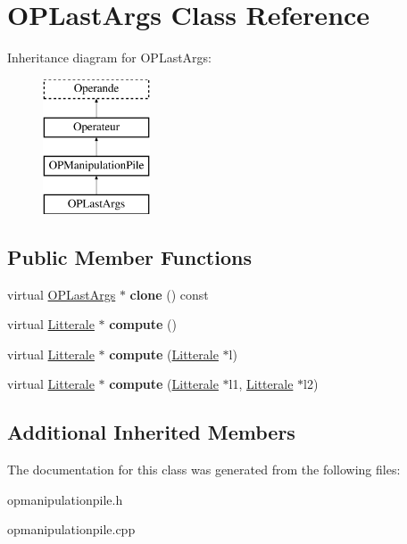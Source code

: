 \hypertarget{class_o_p_last_args}{}\section{O\+P\+Last\+Args Class Reference}
\label{class_o_p_last_args}
Inheritance diagram for O\+P\+Last\+Args\+:\begin{figure}[H]
\begin{center}
\leavevmode
\includegraphics[height=4.000000cm]{class_o_p_last_args}
\end{center}
\end{figure}
\subsection*{Public Member Functions}
\begin{DoxyCompactItemize}
\item 
virtual \hyperlink{class_o_p_last_args}{O\+P\+Last\+Args} $\ast$ {\bfseries clone} () const \hypertarget{class_o_p_last_args_a4ef41f82d64ffa665ec4b3576730c35a}{}\label{class_o_p_last_args_a4ef41f82d64ffa665ec4b3576730c35a}

\item 
virtual \hyperlink{class_litterale}{Litterale} $\ast$ {\bfseries compute} ()\hypertarget{class_o_p_last_args_a3f532d3d087339d26c18e6acbab7ebe0}{}\label{class_o_p_last_args_a3f532d3d087339d26c18e6acbab7ebe0}

\item 
virtual \hyperlink{class_litterale}{Litterale} $\ast$ {\bfseries compute} (\hyperlink{class_litterale}{Litterale} $\ast$l)\hypertarget{class_o_p_last_args_a0c4b0474ac13e1d56a6cecf1f6970e49}{}\label{class_o_p_last_args_a0c4b0474ac13e1d56a6cecf1f6970e49}

\item 
virtual \hyperlink{class_litterale}{Litterale} $\ast$ {\bfseries compute} (\hyperlink{class_litterale}{Litterale} $\ast$l1, \hyperlink{class_litterale}{Litterale} $\ast$l2)\hypertarget{class_o_p_last_args_a194a34c7b79a102b9d7e4a81743c5050}{}\label{class_o_p_last_args_a194a34c7b79a102b9d7e4a81743c5050}

\end{DoxyCompactItemize}
\subsection*{Additional Inherited Members}


The documentation for this class was generated from the following files\+:\begin{DoxyCompactItemize}
\item 
opmanipulationpile.\+h\item 
opmanipulationpile.\+cpp\end{DoxyCompactItemize}
